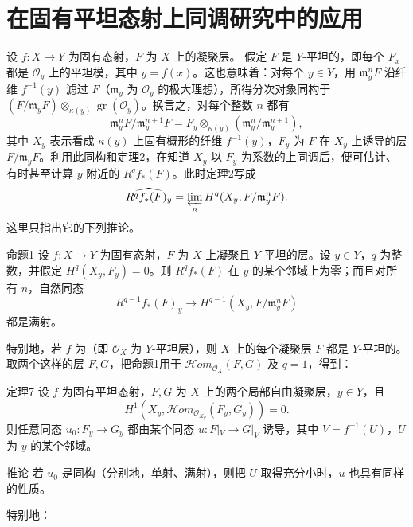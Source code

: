 \section{在固有平坦态射上同调研究中的应用}
设 $f:X\to Y$ 为固有态射，$F$ 为 $X$ 上的凝聚层。
假定 $F$ 是 $Y$-平坦的，即每个 $F_x$ 都是 $\mathcal O_y$ 上的平坦模，其中 $y=f(x)$。这也意味着：对每个 $y\in Y$，用 $\mathfrak m_y^nF$ 沿纤维 $f^{-1}(y)$ 滤过 $F$（$\mathfrak m_y$ 为 $\mathcal O_y$ 的极大理想），所得分次对象同构于 $(F/\mathfrak m_yF)\otimes_{\kappa(y)}\operatorname{gr}(\mathcal O_y)$。换言之，对每个整数 $n$ 都有
\[
\mathfrak m_y^nF/\mathfrak m_y^{n+1}F
=F_y\otimes_{\kappa(y)}(\mathfrak m_y^n/\mathfrak m_y^{n+1}),
\]
其中 $X_y$ 表示看成 $\kappa(y)$ 上固有概形的纤维 $f^{-1}(y)$，$F_y$ 为 $F$ 在 $X_y$ 上诱导的层 $F/\mathfrak m_yF$。利用此同构和定理2，在知道 $X_y$ 以 $F_y$ 为系数的上同调后，便可估计、有时甚至计算 $y$ 附近的 $R^qf_*(F)$。此时定理2写成
\[
\widehat{R^qf_*(F)_y}=\varprojlim_n H^q(X_y,F/\mathfrak m_y^nF).
\]
这里只指出它的下列推论。
\begin{statement}{命题1}
设 $f:X\to Y$ 为固有态射，$F$ 为 $X$ 上凝聚且 $Y$-平坦的层。设 $y\in Y$，$q$ 为整数，并假定 $H^q(X_y,F_y)=0$。则 $R^qf_*(F)$ 在 $y$ 的某个邻域上为零；而且对所有 $n$，自然同态
\[
R^{q-1}f_*(F)_y\longrightarrow H^{q-1}(X_y,F/\mathfrak m_y^nF)
\]
都是满射。
\end{statement}
特别地，若 $f$ 为（即 $\mathcal O_X$ 为 $Y$-平坦层），则 $X$ 上的每个凝聚层 $F$ 都是 $Y$-平坦的。取两个这样的层 $F,G$，把命题1用于 $\mathcal H om_{\mathcal O_X}(F,G)$ 及 $q=1$，得到：
\begin{statement}{定理7}
设 $f$ 为固有平坦态射，$F,G$ 为 $X$ 上的两个局部自由凝聚层，$y\in Y$，且
\[
H^1(X_y,\mathcal H om_{\mathcal O_{X_y}}(F_y,G_y))=0.
\]
则任意同态 $u_0:F_y\to G_y$ 都由某个同态 $u:F|_V\to G|_V$ 诱导，其中 $V=f^{-1}(U)$，$U$ 为 $y$ 的某个邻域。
\end{statement}
\begin{statement}{推论}
若 $u_0$ 是同构（分别地，单射、满射），则把 $U$ 取得充分小时，$u$ 也具有同样的性质。
\end{statement}
特别地：

